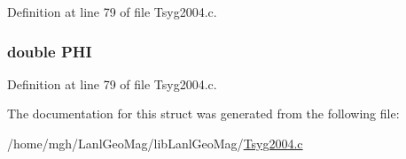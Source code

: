Definition at line 79 of file Tsyg2004.c.\hypertarget{struct___c_b___r_c_p_a_r_38d8f926202c5208f4ea151b52bfe3ef}{
\subsubsection[{PHI}]{\setlength{\rightskip}{0pt plus 5cm}double {\bf PHI}}}
\label{struct___c_b___r_c_p_a_r_38d8f926202c5208f4ea151b52bfe3ef}




Definition at line 79 of file Tsyg2004.c.

The documentation for this struct was generated from the following file:\begin{CompactItemize}
\item 
/home/mgh/LanlGeoMag/libLanlGeoMag/\hyperlink{_tsyg2004_8c}{Tsyg2004.c}\end{CompactItemize}
